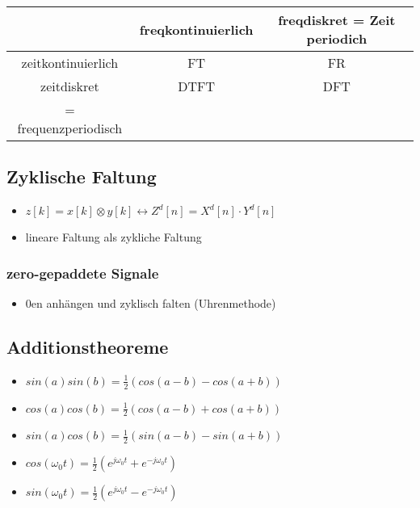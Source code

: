 \documentclass{article}
\begin{document}
 \begin{tabular}{c |c| c}
  & freqkontinuierlich & freqdiskret = Zeit periodich\\ \hline
  zeitkontinuierlich & FT & FR \\ \hline
 zeitdiskret &DTFT & DFT \\
 = frequenzperiodisch  & \\
 \end{tabular}

\subsection{Zyklische Faltung}
\begin{itemize}
\item $z[k] = x[k]\otimes y[k] \leftrightarrow Z^d[n] = X^d[n]\cdot Y^d[n]$
\item lineare Faltung als zykliche Faltung
\end{itemize}

\subsubsection{zero-gepaddete Signale}
\begin{itemize}
\item 0en anhängen und zyklisch falten (Uhrenmethode)

\end{itemize}

\subsection{Additionstheoreme}
\begin{itemize}
\item $sin(a)sin(b)=\frac{1}{2} (cos(a-b)-cos(a+b))$
\item $cos(a)cos(b)=\frac{1}{2} (cos(a-b)+cos(a+b))$
\item $sin(a)cos(b)=\frac{1}{2} (sin(a-b)-sin(a+b))$
\item $cos(\omega_0 t) = \frac{1}{2}(e^{j\omega_0 t}+e^{-j\omega_0 t })$
\item $sin(\omega_0 t) = \frac{1}{2}(e^{j\omega_0 t}-e^{-j\omega_0 t })$
\end{itemize}
\end{document}

